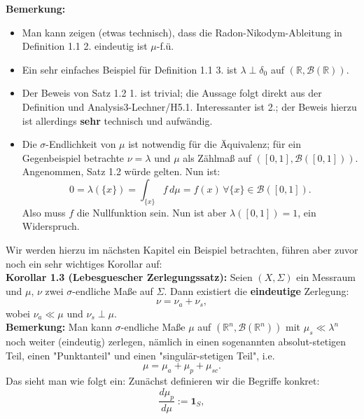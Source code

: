 \documentclass[11pt,english]{smfart}
\begin{document}
\vspace{0.5cm}
\textbf{Bemerkung:} \begin{itemize}
    \item Man kann zeigen (etwas technisch), dass die Radon-Nikodym-Ableitung in Definition 1.1 2. eindeutig ist \(\mu\)-f.ü.
    \item Ein sehr einfaches Beispiel für Definition 1.1 3. ist \(\lambda \perp \delta_0\) auf \((\mathbb{R},\mathcal{B}(\mathbb{R}))\).
    \item Der Beweis von Satz 1.2 1. ist trivial; die Aussage folgt direkt aus der Definition und Analysis3-Lechner/H5.1. Interessanter ist 2.; der Beweis hierzu ist allerdings \textbf{sehr} technisch und aufwändig.
    \item Die \(\sigma\)-Endlichkeit von \(\mu\) ist notwendig für die Äquivalenz; für ein Gegenbeispiel betrachte \(\nu = \lambda\) und \(\mu\) als Zählmaß auf \(([0,1],\mathcal{B}([0,1]))\). Angenommen, Satz 1.2 würde gelten. Nun ist:
    \begin{equation}
        0 = \lambda(\{x\}) = \int_{\{x\}} f \,d\mu = f(x) \, \forall \{x\} \in \mathcal{B}([0,1]).
    \end{equation}
    Also muss \(f\) die Nullfunktion sein. Nun ist aber \(\lambda([0,1])=1\), ein Widerspruch.
\end{itemize}
\vspace{0.5cm}
Wir werden hierzu im nächsten Kapitel ein Beispiel betrachten, führen aber zuvor noch ein sehr wichtiges Korollar auf:\\[0.5cm]
\textbf{Korollar 1.3 (Lebesguescher Zerlegungssatz):} Seien \((X,\Sigma)\) ein Messraum und \(\mu, \, \nu\) zwei \(\sigma\)-endliche Maße auf \(\Sigma\). Dann existiert die \textbf{eindeutige} Zerlegung:
\begin{equation}
    \nu = \nu_a + \nu_s,
\end{equation}
wobei \(\nu_a \ll \mu\) und \(\nu_s \perp \mu\).\\[0.5cm]
\textbf{Bemerkung:} Man kann \(\sigma\)-endliche Maße \(\mu\) auf \((\mathbb{R}^n, \mathcal{B}(\mathbb{R}^n))\) mit \(\mu_s \ll \lambda^n\) noch weiter (eindeutig) zerlegen, nämlich in einen sogenannten absolut-stetigen Teil, einen "Punktanteil" und einen "singulär-stetigen Teil", i.e.
\begin{equation}
    \mu = \mu_a + \mu_p + \mu_{sc}.
\end{equation}
Das sieht man wie folgt ein: Zunächst definieren wir die Begriffe konkret:
\begin{equation}
    \frac{d\mu_p}{d\mu} := \textbf{1}_{S},
\end{equation}
\end{document}
